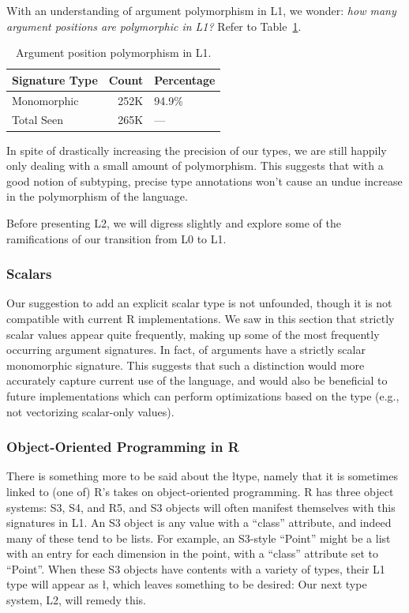 \documentclass[acmsmall,10pt,review,anonymous]{acmart}\settopmatter{printfolios=true,printccs=false,printacmref=false}
\begin{document}
With an understanding of argument polymorphism in L1, we wonder: {\it how many argument positions are polymorphic in L1?}
Refer to Table~\ref{tab:argcountsL1}.

\begin{table}[ht]
\label{tab:argcountsL1}
\centering
\begin{tabular}{lrl}
  \hline
Signature Type & Count & Percentage \\ 
  \hline
  Monomorphic & 252K & 94.9\% \\ 
  Total Seen & 265K & --- \\ 
   \hline
\end{tabular}
\caption{Argument position polymorphism in L1.}
\end{table}

In spite of drastically increasing the precision of our types, we are still happily only dealing with a small amount of polymorphism.
This suggests that with a good notion of subtyping, precise type annotations won't cause an undue increase in the polymorphism of the language.


Before presenting L2, we will digress slightly and explore some of the ramifications of our transition from L0 to L1.

%
%
\subsubsection{Scalars}
\label{sec:scalars}

Our suggestion to add an explicit scalar type is not unfounded, though it is not compatible with current R implementations.
We saw in this section that strictly scalar values appear quite frequently, making up some of the most frequently occurring argument signatures.
In fact, \PERCSCALARMONO of arguments have a strictly scalar monomorphic signature.
This suggests that such a distinction would more accurately capture current use of the language, and would also be beneficial to future implementations which can perform optimizations based on the type (e.g., not vectorizing scalar-only values).

%
%
\subsubsection{Object-Oriented Programming in R}
\label{sec:S3S4R5}

There is something more to be said about the \l type, namely that it is sometimes linked to (one of) R's takes on object-oriented programming.
R has three object systems: S3, S4, and R5, and S3 objects will often manifest themselves with this signatures in L1.
An S3 object is any value with a ``class'' attribute, and indeed many of these tend to be lists.
For example, an S3-style ``Point'' might be a list with an entry for each dimension in the point, with a ``class'' attribute set to ``Point''.
When these S3 objects have contents with a variety of types, their L1 type will appear as \l, which leaves something to be desired:
Our next type system, L2, will remedy this.
\end{document}
